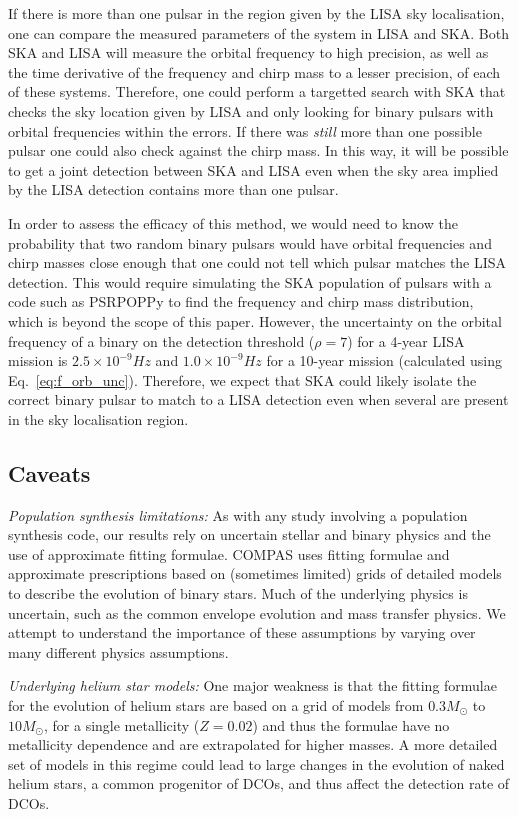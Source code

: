 If there is more than one pulsar in the region given by the LISA sky localisation, one can compare the measured parameters of the system in LISA and SKA. Both SKA and LISA will measure the orbital frequency to high precision, as well as the time derivative of the frequency and chirp mass to a lesser precision, of each of these systems. Therefore, one could perform a targetted search with SKA that checks the sky location given by LISA and only looking for binary pulsars with orbital frequencies within the errors. If there was \textit{still} more than one possible pulsar one could also check against the chirp mass. In this way, it will be possible to get a joint detection between SKA and LISA even when the sky area implied by the LISA detection contains more than one pulsar.

In order to assess the efficacy of this method, we would need to know the probability that two random binary pulsars would have orbital frequencies and chirp masses close enough that one could not tell which pulsar matches the LISA detection. This would require simulating the SKA population of pulsars with a code such as PSRPOPPy to find the frequency and chirp mass distribution, which is beyond the scope of this paper. However, the uncertainty on the orbital frequency of a binary on the detection threshold ($\rho = 7$) for a 4-year LISA mission is $2.5 \times 10^{-9} \unit{Hz}$ and $1.0 \times 10^{-9} \unit{Hz}$ for a 10-year mission (calculated using Eq.~\ref{eq:f_orb_unc}). Therefore, we expect that SKA could likely isolate the correct binary pulsar to match to a LISA detection even when several are present in the sky localisation region.

\subsection{Caveats}\label{sec:caveats}
\textit{Population synthesis limitations:} As with any study involving a population synthesis code, our results rely on uncertain stellar and binary physics and the use of approximate fitting formulae. COMPAS uses fitting formulae and approximate prescriptions based on (sometimes limited) grids of detailed models to describe the evolution of binary stars. Much of the underlying physics is uncertain, such as the common envelope evolution and mass transfer physics. We attempt to understand the importance of these assumptions by varying over many different physics assumptions.

\textit{Underlying helium star models:} One major weakness is that the \citet{Hurley+2000} fitting formulae for the evolution of helium stars are based on a grid of models from $0.3 \unit{M_{\odot}}$ to $10 \unit{M_{\odot}}$, for a single metallicity ($Z= 0.02$) and thus the formulae have no metallicity dependence and are extrapolated for higher masses. A more detailed set of models in this regime could lead to large changes in the evolution of naked helium stars, a common progenitor of DCOs, and thus affect the detection rate of DCOs.

